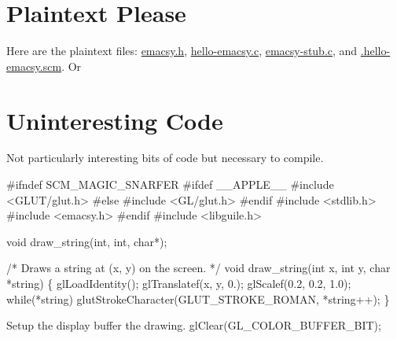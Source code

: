 \begin{subappendices}

\section{Plaintext Please}
Here are the plaintext files: \href{http://gnufoo.org/emacsy/emacsy.h}{emacsy.h},
\href{http://gnufoo.org/emacsy/hello-emacsy.c}{hello-emacsy.c},
\href{http://gnufoo.org/emacsy/emacsy-stub.c}{emacsy-stub.c}, and
\href{http://gnufoo.org/emacsy/.hello-emacsy.scm}{.hello-emacsy.scm}. Or 

\section{Uninteresting Code}
Not particularly interesting bits of code but necessary to compile.

\lstset{basicstyle=\footnotesize}

\nwenddocs{}\endmoddef\nwstartdeflinemarkup{}\nwenddeflinemarkup
#ifndef SCM_MAGIC_SNARFER
#ifdef __APPLE__
#include <GLUT/glut.h> 
#else
#include <GL/glut.h> 
#endif
#include <stdlib.h>
#include <emacsy.h>
#endif
#include <libguile.h>

void draw_string(int, int, char*);
\nwendcode{}\nwdocspar

\nwenddocs{}\plusendmoddef\nwstartdeflinemarkup{}\nwenddeflinemarkup
/* Draws a string at (x, y) on the screen. */
void draw_string(int x, int y, char *string) \{
  glLoadIdentity();
  glTranslatef(x, y, 0.);
  glScalef(0.2, 0.2, 1.0);
  while(*string) 
    glutStrokeCharacter(GLUT_STROKE_ROMAN, 
                        *string++);
\}
\nwendcode{}\nwdocspar

Setup the display buffer the drawing.
\nwenddocs{}\endmoddef\nwstartdeflinemarkup{}\nwenddeflinemarkup
glClear(GL_COLOR_BUFFER_BIT);


\end{subappendices}

